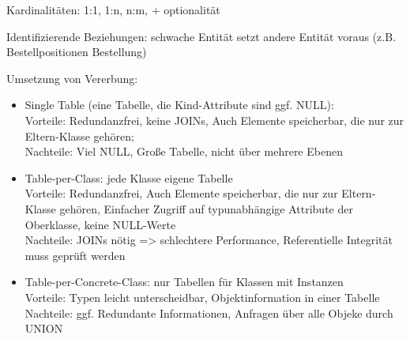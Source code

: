 Kardinalitäten: 1:1, 1:n, n:m, + optionalität

Identifizierende Beziehungen: schwache Entität setzt andere Entität voraus (z.B. Bestellpositionen Bestellung)


Umsetzung von Vererbung:
\begin{itemize}
\item Single Table (eine Tabelle, die Kind-Attribute sind ggf. NULL): \\
Vorteile: Redundanzfrei, keine JOINs, Auch Elemente speicherbar, die nur zur Eltern-Klasse gehören; \\
Nachteile: Viel NULL, Große Tabelle, nicht über mehrere Ebenen
\item Table-per-Class: jede Klasse eigene Tabelle \\
Vorteile: Redundanzfrei, Auch Elemente speicherbar, die nur zur Eltern-Klasse gehören, Einfacher Zugriff auf typunabhängige Attribute der Oberklasse, keine NULL-Werte  \\
Nachteile: JOINs nötig => schlechtere Performance, Referentielle Integrität muss geprüft werden
\item  Table-per-Concrete-Class: nur Tabellen für Klassen mit Instanzen \\
Vorteile: Typen leicht unterscheidbar, Objektinformation in einer Tabelle \\
Nachteile: ggf. Redundante Informationen, Anfragen über alle Objeke durch UNION
\end{itemize}

